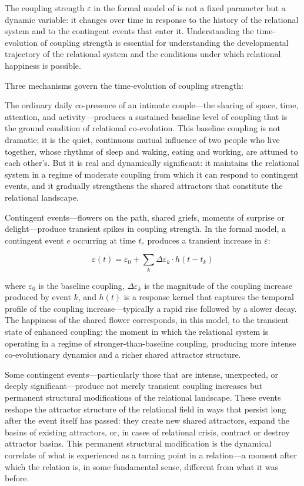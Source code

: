 \noindent
The coupling strength $\varepsilon$ in the formal model of  is not a fixed parameter but a dynamic variable: it changes over time in response to the history of the relational system and to the contingent events that enter it. Understanding the time-evolution of coupling strength is essential for understanding the developmental trajectory of the relational system and the conditions under which relational happiness is possible.

Three mechanisms govern the time-evolution of coupling strength:

 The ordinary daily co-presence of an intimate couple---the sharing of space, time, attention, and activity---produces a sustained baseline level of coupling that is the ground condition of relational co-evolution. This baseline coupling is not dramatic; it is the quiet, continuous mutual influence of two people who live together, whose rhythms of sleep and waking, eating and working, are attuned to each other's. But it is real and dynamically significant: it maintains the relational system in a regime of moderate coupling from which it can respond to contingent events, and it gradually strengthens the shared attractors that constitute the relational landscape.

 Contingent events---flowers on the path, shared griefs, moments of surprise or delight---produce transient spikes in coupling strength. In the formal model, a contingent event $e$ occurring at time $t_e$ produces a transient increase in $\varepsilon$:

\begin{equation}
\varepsilon(t) = \varepsilon_0 + \sum_k \Delta\varepsilon_k \cdot h(t - t_k)
\end{equation}

where $\varepsilon_0$ is the baseline coupling, $\Delta\varepsilon_k$ is the magnitude of the coupling increase produced by event $k$, and $h(t)$ is a response kernel that captures the temporal profile of the coupling increase---typically a rapid rise followed by a slower decay. The happiness of the shared flower corresponds, in this model, to the transient state of enhanced coupling: the moment in which the relational system is operating in a regime of stronger-than-baseline coupling, producing more intense co-evolutionary dynamics and a richer shared attractor structure.

 Some contingent events---particularly those that are intense, unexpected, or deeply significant---produce not merely transient coupling increases but permanent structural modifications of the relational landscape. These events reshape the attractor structure of the relational field in ways that persist long after the event itself has passed: they create new shared attractors, expand the basins of existing attractors, or, in cases of relational crisis, contract or destroy attractor basins. This permanent structural modification is the dynamical correlate of what is experienced as a turning point in a relation---a moment after which the relation is, in some fundamental sense, different from what it was before.

